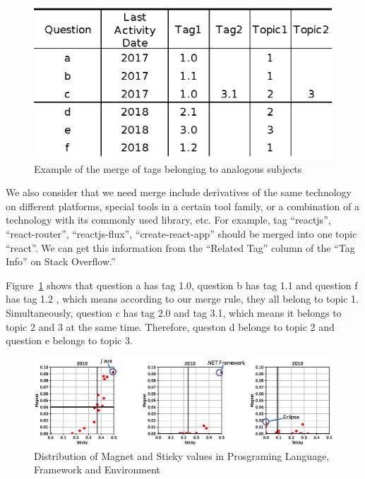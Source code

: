 \documentclass[english,preprint,JIP]{ipsj}
\begin{document}
\begin{figure}[t]
 \centering
 \includegraphics[width=0.80\hsize]{img/example001.eps}  
 \caption{Example of the merge of tags belonging to analogous subjects} 
 \label{fig:example1} 
\end{figure}


We also consider that we need merge include derivatives of the same technology on different platforms, special tools in a certain tool family, or a combination of a technology with its commonly used library, etc. For example, tag ``reactjs'', ``react-router'', ``reactjs-flux'', ``create-react-app'' should be merged into one topic ``react''.
We can get this information from the ``Related Tag'' column of the ``Tag Info'' on Stack Overflow.''

Figure~\ref{fig:example1} shows that question a has tag 1.0, question b has tag 1.1 and question f has tag 1.2 , which means according to our merge rule, they all belong to topic 1.  Simultaneously, question c has tag 2.0 and tag 3.1, which means it belongs to topic 2 and 3 at the same time. Therefore, queston d belongs to topic 2 and question e belongs to topic 3.


\begin{figure}[t]
 \centering
 \includegraphics[width=1.0\hsize]{img/2010all.eps}  
 \caption{Distribution of Magnet and Sticky values in Prosgraming Language, Framework and Environment} 
 \label{fig:2010} 
\end{figure}
\smallskip
\end{document}
